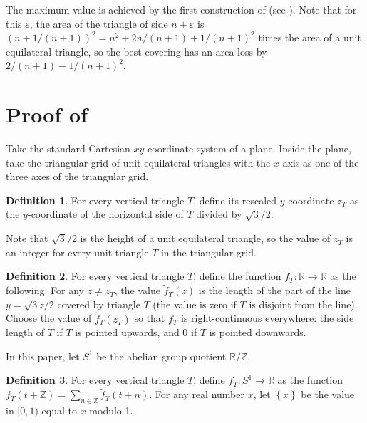\documentclass[a4paper]{amsart}
\theoremstyle{plain}
\theoremstyle{definition}
\newtheorem{definition}{Definition}
\begin{document}
The maximum value is achieved by the first construction of \cite{conway2004coverup} (see ).
Note that for this $\varepsilon$, the area of the triangle of side $n + \varepsilon$ is $(n + 1/(n+1))^2 = n^2 + 2n/(n+1) + 1/(n+1)^2$ times the area of a unit equilateral triangle,
so the best covering has an area loss by $2/(n+1) - 1/(n+1)^2$. 

\section{Proof of }

Take the standard Cartesian \(xy\)-coordinate system of a plane.
Inside the plane, take the triangular grid of unit equilateral triangles with the \(x\)-axis as one of the three axes of the triangular grid.

\begin{definition}
For every vertical triangle \(T\), define its rescaled \(y\)-coordinate \(z_T\) as the \(y\)-coordinate of the horizontal side of $T$ divided by \(\sqrt{3}/2\).
\label{def:rescaled-coord}
\end{definition}

Note that \(\sqrt{3}/2\) is the height of a unit equilateral triangle, so the value of \(z_T\) is an integer for every unit triangle \(T\) in the triangular grid.

\begin{definition}
For every vertical triangle \(T\), define the function \(\tilde{f}_T : \mathbb{R} \to \mathbb{R}\) as the following. For any \(z \neq z_T\), the value \(\tilde{f}_T(z)\) is the length of the part of the line \(y = \sqrt{3}z / 2\) covered by triangle \(T\) (the value is zero if \(T\) is disjoint from the line). Choose the value of \(\tilde{f}_T(z_T)\) so that \(\tilde{f}_T\) is right-continuous everywhere: the side length of $T$ if \(T\) is pointed upwards, and 0 if \(T\) is pointed downwards.
\label{def:vertical-triangle-function}
\end{definition}

In this paper, let \(S^1\) be the abelian group quotient \(\mathbb{R} /\mathbb{Z}\).
\begin{definition}
For every vertical triangle \(T\), define \(f_T : S^1 \to \mathbb{R}\) as the function \(f_T(t + \mathbb{Z}) = \sum_{n \in \mathbb{Z}} \tilde{f}_T(t + n)\).
For any real number \(x\), let \(\left\{ x \right\}\) be the value in \([0, 1)\) equal to \(x\) modulo 1.
\label{def:projection-ftn}	
\end{definition}
\end{document}
